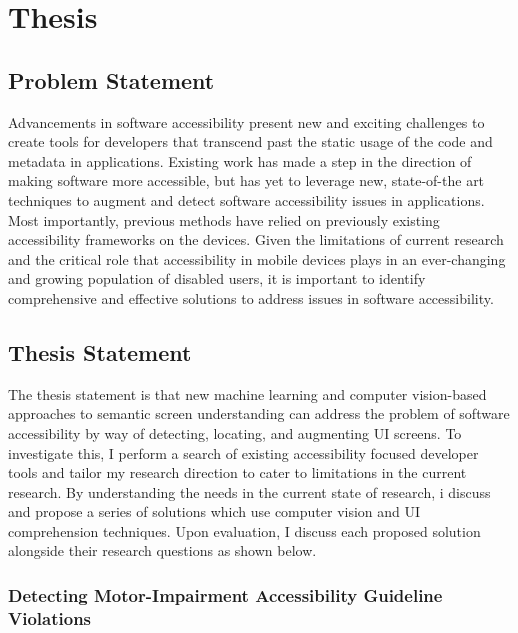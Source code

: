 \newpage
\section{Thesis}
\label{sec:thesis}

\subsection{Problem Statement}
Advancements in software accessibility present new and exciting challenges to create tools for developers that transcend past the static usage of the code and metadata in applications. Existing work has made a step in the direction of making software more accessible, but has yet to leverage new, state-of-the art techniques to augment and detect software accessibility issues in applications. Most importantly, previous methods have relied on previously existing accessibility frameworks on the devices. Given the limitations of current research and the critical role that accessibility in mobile devices plays in an ever-changing and growing population of disabled users, it is important to identify comprehensive and effective solutions to address issues in software accessibility. 


\subsection{Thesis Statement}

The thesis statement is that new machine learning and computer vision-based approaches to semantic screen understanding can address the problem of software accessibility by way of detecting, locating, and augmenting UI screens. To investigate this, I perform a search of existing accessibility focused developer tools and tailor my research direction to cater to limitations in the current research. By understanding the needs in the current state of research, i discuss and propose a series of solutions which use computer vision and UI comprehension techniques. Upon evaluation, I discuss each proposed solution alongside their research questions as shown below. 


\subsubsection{Detecting Motor-Impairment Accessibility Guideline Violations}

